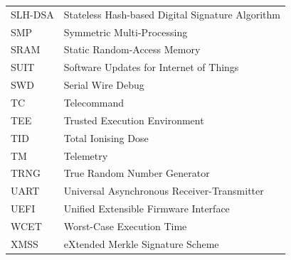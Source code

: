 \begin{longtable}{p{2.5cm}p{8cm}}
    SLH-DSA & Stateless Hash-based Digital Signature Algorithm \\
    SMP     & Symmetric Multi-Processing \\
    SRAM    & Static Random-Access Memory \\
    SUIT    & Software Updates for Internet of Things \\
    SWD     & Serial Wire Debug \\
    TC      & Telecommand \\
    TEE     & Trusted Execution Environment \\
    TID     & Total Ionising Dose \\
    TM      & Telemetry \\
    TRNG    & True Random Number Generator \\
    UART    & Universal Asynchronous Receiver-Transmitter \\
    UEFI    & Unified Extensible Firmware Interface \\
    WCET    & Worst-Case Execution Time \\
    XMSS    & eXtended Merkle Signature Scheme \\
    \bottomrule
\end{longtable}
